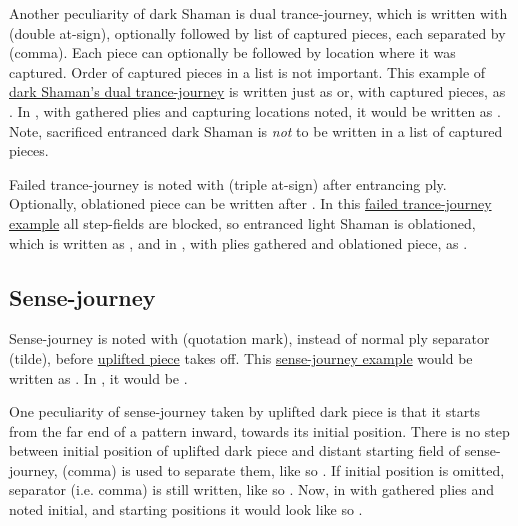 Another peculiarity of dark Shaman is dual trance-journey, which is written with 
(double at-sign), optionally followed by list of captured pieces, each separated by \alg{,}
(comma). Each piece can optionally be followed by location where it was captured. Order of
captured pieces in a list is not important. This example of
\hyperref[fig:scn_cot_62_dark_dark_shaman_double_interaction_start]{dark Shaman's dual trance-journey}
is written just as  or, with captured pieces, as
. In , with gathered plies and capturing locations noted,
it would be written as \newline
{} \newline
{}. \newline
Note, sacrificed entranced dark Shaman is \emph{not} to be written in a list of captured
pieces.

Failed trance-journey is noted with  (triple at-sign) after entrancing ply.
Optionally, oblationed piece can be written after . In this
\hyperref[fig:scn_o_37_trance_journey_failed]{failed trance-journey example} all
step-fields are blocked, so entranced light Shaman is oblationed, which is written as
, and in , with plies gathered and oblationed piece, as
.

\subsection*{Sense-journey}
\label{sec:Appendix/Notation/Sense-journey}

Sense-journey is noted with  (quotation mark), instead of normal ply separator
\alg{\~{}} (tilde), before \hyperref[fig:scn_o_42_uplifting_step]{uplifted piece} takes
off. This \hyperref[fig:scn_o_45_dark_piece_sense_journey]{sense-journey example} would
be written as . In , it would be
.

One peculiarity of sense-journey taken by uplifted dark piece is that it starts from
the far end of a pattern inward, towards its initial position. There is no step between
initial position of uplifted dark piece and distant starting field of sense-journey,
\alg{,} (comma) is used to separate them, like so
.
If initial position is omitted, separator (i.e. comma) is still written, like so
. Now, in  with gathered plies
and noted initial, and starting positions it would look like so \newline
{} \newline
\alg{[Bc5,z11-n7]}.


